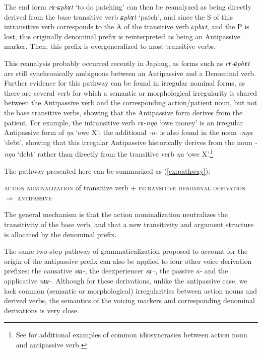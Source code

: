 \documentclass[oneside,a4paper,11pt]{article}
\newcommand{\ipa}[1]{\mbox{\phon\textit{#1}}} %
\begin{document}
The end form \ipa{rɤ-ɕphɤt} `to do patching' can then be reanalyzed as being directly derived from the base transitive verb \ipa{ɕphɤt} `patch', and since the S of this intransitive verb corresponds to the A of the transitive verb \ipa{ɕphɤt}, and the P is lost, this originally denominal prefix is reinterpreted as being an Antipassive marker. Then, this prefix is overgeneralized to most transitive verbs.

This reanalysis probably occurred recently in Japhug, as forms such as \ipa{rɤ-ɕphɤt} are still synchronically ambiguous between an Antipassive and a Denominal verb. Further evidence for this pathway can be found in irregular nominal forms, as there are several verb for which a semantic or morphological irregularity is shared between the Antipassive verb and the corresponding action/patient noun, but not the base transitive verbs, showing that the Antipassive form derives from the patient. For example, the intransitive verb \ipa{rɤ-nŋa} `owe money' is an irregular Antipassive form of \ipa{ŋa} `owe X'; the additional \ipa{-n-} is also found in the noun \ipa{-nŋa} `debt', showing that this irregular Antipassive historically derives from the noun \ipa{-nŋa} `debt' rather than directly from the transitive verb \ipa{ŋa} `owe X'.\footnote{See \citet{jacques14antipassive} for additional examples of common idiosyncrasies between action noun and antipassive verb.}

The pathway presented here can be summarized as (\ref{ex:pathway}):

\begin{exe}
\ex \label{ex:pathway}
\glt \textsc{action nominalization} of transitive verb + \textsc{intransitive denominal derivation} $\Rightarrow$ \textsc{antipassive}
\end{exe}

The general mechanism is that the action nominalization neutralizes the transitivity of the base verb, and that a new transitivity and argument structure is allocated by the denominal prefix.

 The same two-step pathway of grammaticalization proposed to account for the origin of the antipassive prefix can also be applied to four other voice derivation prefixes: the causative \ipa{sɯ-}, the deexperiencer \ipa{sɤ--}, the passive \ipa{a-} and the applicative \ipa{nɯ-}. Although for these derivations, unlike the antipassive case, we lack common (semantic or morphological) irregularities between action nouns and derived verbs, the semantics of the voicing markers and corresponding denominal derivations is very close.
\end{document}
